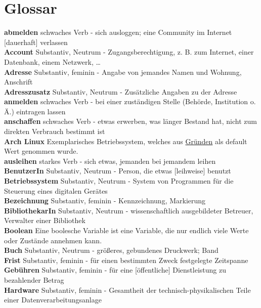 \documentclass{article}
\begin{document}
    \section*{Glossar}
    \textbf{abmelden} schwaches Verb - sich ausloggen; eine Community im Internet [dauerhaft] verlassen \\
    \textbf{Account} Substantiv, Neutrum - Zugangsberechtigung, z. B. zum Internet, einer Datenbank, einem Netzwerk, \ldots\\
    \textbf{Adresse} Substantiv, feminin - Angabe von jemandes Namen und Wohnung, Anschrift\\
    \textbf{Adresszusatz} Substantiv, Neutrum - Zusätzliche Angaben zu der Adresse\\
    \textbf{anmelden} schwaches Verb - bei einer zuständigen Stelle (Behörde, Institution o. Ä.) eintragen lassen\\
    \textbf{anschaffen} schwaches Verb - etwas erwerben, was länger Bestand hat, nicht zum direkten Verbrauch bestimmt ist\\
    \textbf{Arch Linux} Exemplarisches Betriebssystem, welches aus \href{https://www.reddit.com/r/unixporn/}{Gründen} als default Wert genommen wurde. \\
    \textbf{ausleihen} starkes Verb - sich etwas, jemanden bei jemandem leihen\\
    \textbf{BenutzerIn} Substantiv, Neutrum - Person, die etwas [leihweise] benutzt\\
    \textbf{Betriebssystem} Substantiv, Neutrum - System von Programmen für die Steuerung eines digitalen Gerätes\\
    \textbf{Bezeichnung} Substantiv, feminin - Kennzeichnung, Markierung\\
    \textbf{BibliothekarIn} Substantiv, Neutrum - wissenschaftlich ausgebildeter Betreuer, Verwalter einer Bibliothek\\
    \textbf{Boolean} Eine boolesche Variable ist eine Variable, die nur endlich viele Werte oder Zustände annehmen kann.\\
    \textbf{Buch} Substantiv, Neutrum - größeres, gebundenes Druckwerk; Band\\
    \textbf{Frist} Substantiv, feminin - für einen bestimmten Zweck festgelegte Zeitspanne\\
    \textbf{Gebühren} Substantiv, feminin - für eine [öffentliche] Dienstleistung zu bezahlender Betrag\\
    \textbf{Hardware} Substantiv, feminin - Gesamtheit der technisch-physikalischen Teile einer Datenverarbeitungsanlage\\
\end{document}
